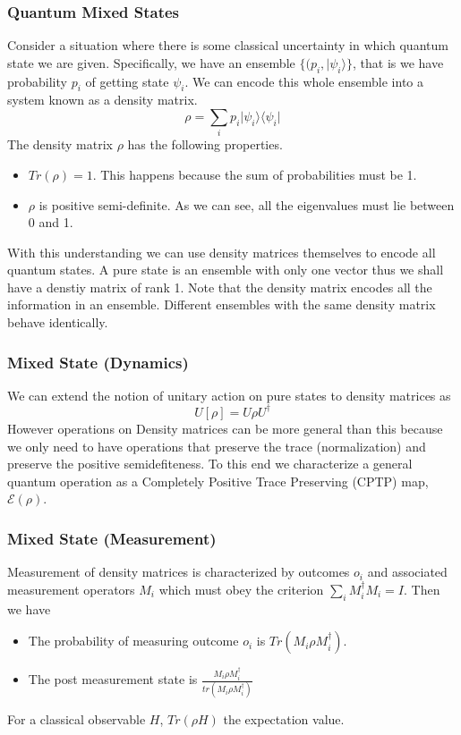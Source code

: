 \documentclass{beamer}
\newcommand{\bra}[1]{\langle #1 \vert}
\newcommand{\ket}[1]{\vert #1 \rangle}
\begin{document}
\begin{frame}
  \frametitle{Quantum Mixed States}
  Consider a situation where there is some classical uncertainty in which quantum state we are given. Specifically, we have an ensemble $\{(p_i,\ket{\psi_i}\}$, that is we have probability $p_i$ of getting state $\psi_i$. We can encode this whole ensemble into a system known as a density matrix.
\[
  \rho = \sum_i p_i \ket{\psi_i}\bra{\psi_i}
\]
The density matrix $\rho$ has the following properties.
\begin{itemize}
\item $Tr(\rho) = 1$. This happens because the sum of probabilities must be 1.
\item $\rho$ is positive semi-definite. As we can see, all the eigenvalues must lie between 0 and 1.
\end{itemize}
With this understanding we can use density matrices themselves to encode all quantum states. A pure state is an ensemble with only one vector thus we shall have a denstiy matrix of rank 1. Note that the density matrix encodes all the information in an ensemble. Different ensembles with the same density matrix behave identically.
\end{frame}

\begin{frame}
  \frametitle{Mixed State (Dynamics)}
  We can extend the notion of unitary action on pure states to density matrices as
  \[
    U[\rho] = U\rho U^{\dagger}
  \]
  However operations on Density matrices can be more general than this because we only need to have operations that preserve the trace (normalization) and preserve the positive semidefiteness. To this end we characterize a general quantum operation as a Completely Positive Trace Preserving (CPTP) map, $\mathcal{E}(\rho)$.
\end{frame}

\begin{frame}
  \frametitle{Mixed State (Measurement)}
  Measurement of density matrices is characterized by outcomes $o_i$ and associated measurement operators $M_i$ which must obey the criterion $\sum_i M_i^{\dagger} M_i = I$. Then we have
  
  \begin{itemize}
  \item  The probability of measuring outcome $o_i$ is $Tr(M_i\rho M_i^{\dagger})$.
    
  \item  The post measurement state is $\frac{M_i \rho M_i^{\dagger}}{tr(M_i \rho M_i^{\dagger})}$
  \end{itemize}

  For a classical observable $H$, $Tr(\rho H)$ the expectation value.

\end{frame}
\end{document}
